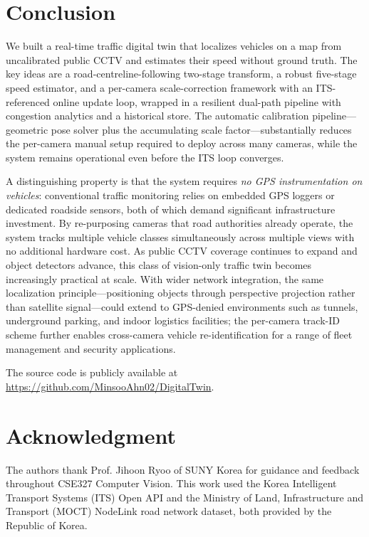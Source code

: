 \documentclass[conference]{IEEEtran}
\renewcommand{\_}{\textunderscore\allowbreak}
\begin{document}
\section{Conclusion}\label{sec:concl}
We built a real-time traffic digital twin that localizes vehicles on a map from
uncalibrated public CCTV and estimates their speed without ground truth. The key
ideas are a road-centreline-following two-stage transform, a robust five-stage speed
estimator, and a per-camera scale-correction framework with an ITS-referenced online
update loop, wrapped in a resilient dual-path pipeline with congestion analytics and
a historical store. The automatic calibration pipeline---geometric pose solver plus
the accumulating scale factor---substantially reduces the per-camera manual setup
required to deploy across many cameras, while the system remains operational even
before the ITS loop converges.

A distinguishing property is that the system requires \emph{no GPS instrumentation
on vehicles}: conventional traffic monitoring relies on embedded GPS loggers or
dedicated roadside sensors, both of which demand significant infrastructure
investment. By re-purposing cameras that road authorities already operate, the
system tracks multiple vehicle classes simultaneously across multiple views with no
additional hardware cost. As public CCTV coverage continues to expand and object
detectors advance, this class of vision-only traffic twin becomes increasingly
practical at scale. With wider network integration, the same localization
principle---positioning objects through perspective projection rather than satellite
signal---could extend to GPS-denied environments such as tunnels, underground
parking, and indoor logistics facilities; the per-camera track-ID scheme further
enables cross-camera vehicle re-identification for a range of fleet management and
security applications.

The source code is publicly available at \url{https://github.com/MinsooAhn02/DigitalTwin}.

\section*{Acknowledgment}
The authors thank Prof. Jihoon Ryoo of SUNY Korea for guidance and feedback
throughout CSE327 Computer Vision. This work used the Korea Intelligent
Transport Systems (ITS) Open API and the Ministry of Land, Infrastructure and
Transport (MOCT) NodeLink road network dataset, both provided by the Republic
of Korea.



\end{document}
